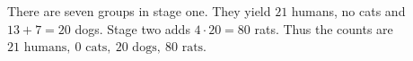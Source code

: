 There are seven groups in stage one. They yield $21$ humans, no cats and $13+7=20$ dogs. Stage two adds $4\cdot20=80$ rats. Thus the counts are $\boxed{21\text{ humans},\ 0\text{ cats},\ 20\text{ dogs},\ 80\text{ rats}}$.
